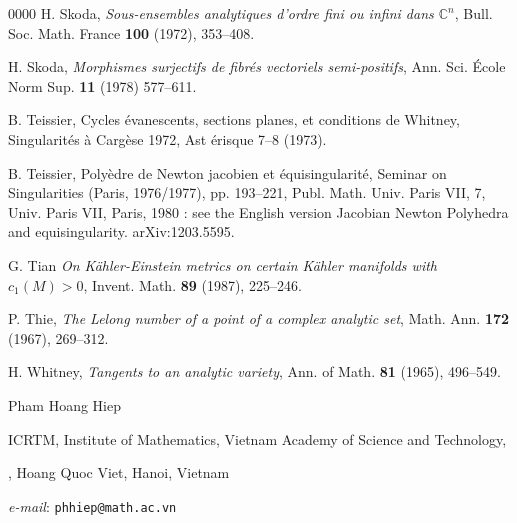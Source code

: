 \documentclass[a4paper,oneside,reqno,11pt]{article}
\def\bC{\mathbb C}
\def\bC{\mathbb C}
\def\n{\noindent}
\def\n{\noindent}
\begin{document}
\begin{thebibliography}{0000}
 H. Skoda, {\it Sous-ensembles analytiques d'ordre fini ou infini dans $\bC^n$}, Bull. Soc. Math. France {\bf 100} (1972), 353--408.

 H. Skoda, {\it Morphismes surjectifs de fibr\'{e}s vectoriels semi-positifs}, Ann. Sci. \'{E}cole Norm
Sup. {\bf 11} (1978) 577--611.

 B. Teissier, Cycles  \'{e}vanescents, sections planes, et conditions de Whitney, Singularit\'{e}s \`{a}  Carg\`{e}se 1972, Ast \'{e}risque 7--8 (1973).

  B. Teissier, Poly\`{e}dre de Newton jacobien et \'{e}quisingularit\'{e}, Seminar on Singularities (Paris, 1976/1977), pp. 193--221, Publ. Math. Univ. Paris VII, 7, Univ. Paris VII, Paris, 1980 : see the English version Jacobian Newton Polyhedra and equisingularity. arXiv:1203.5595.

 G. Tian {\it On K\"{a}hler-Einstein metrics on certain K\"{a}hler manifolds with $c_1(M) > 0$}, Invent. Math. {\bf 89} (1987), 225--246.

 P. Thie, {\it The Lelong number of a point of a complex analytic set}, Math. Ann. {\bf 172} (1967), 269--312.

 H. Whitney, {\it Tangents to an analytic variety}, Ann. of Math. {\bf 81} (1965), 496--549.

\end{thebibliography}
\vskip 0.5cm
\n
Pham Hoang Hiep

\n
ICRTM, Institute of Mathematics, Vietnam Academy of Science and Technology, 

\n
18, Hoang Quoc Viet, Hanoi, Vietnam

\n
{\it e-mail\/}: {\tt phhiep@math.ac.vn}
\end{document}
